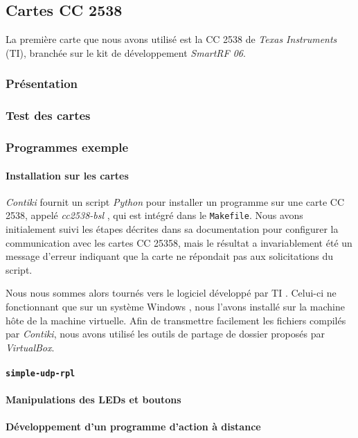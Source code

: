\subsection{Cartes CC 2538}

La première carte que nous avons utilisé est la CC 2538 de \emph{Texas Instruments} (TI), branchée sur le kit de développement \emph{SmartRF 06}.

\subsubsection{Présentation}


\subsubsection{Test des cartes}


\subsubsection{Programmes exemple}

\paragraph{Installation sur les cartes}

\emph{Contiki} fournit un script \emph{Python} pour installer un programme sur une carte CC 2538, appelé \emph{cc2538-bsl} , qui est intégré dans le \texttt{Makefile}.
Nous avons initialement suivi les étapes décrites dans sa documentation pour configurer la communication avec les cartes CC 25358, mais le résultat a invariablement été un message d’erreur indiquant que la carte ne répondait pas aux solicitations du script.


Nous nous sommes alors tournés vers le logiciel développé par TI \todo[nom].
Celui-ci ne fonctionnant que sur un système Windows , nous l’avons installé sur la machine hôte de la machine virtuelle.
Afin de transmettre facilement les fichiers compilés par \emph{Contiki}, nous avons utilisé les outils de partage de dossier proposés par \emph{VirtualBox}.


\paragraph{\texttt{simple-udp-rpl}}


\paragraph{Manipulations des LEDs et boutons}


\paragraph{Développement d’un programme d’action à distance}

